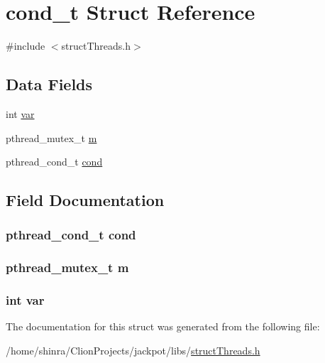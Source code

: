 \hypertarget{structcond__t}{\section{cond\+\_\+t Struct Reference}
\label{structcond__t}
}


{\ttfamily \#include $<$struct\+Threads.\+h$>$}

\subsection*{Data Fields}
\begin{DoxyCompactItemize}
\item 
int \hyperlink{structcond__t_a96c77f9f3a7baec84b9b8add26a31787}{var}
\item 
pthread\+\_\+mutex\+\_\+t \hyperlink{structcond__t_ae105583c374138efc8272abdbd6d2d25}{m}
\item 
pthread\+\_\+cond\+\_\+t \hyperlink{structcond__t_a0a1433271fddfed84bc959ae6c202e5a}{cond}
\end{DoxyCompactItemize}


\subsection{Field Documentation}
\hypertarget{structcond__t_a0a1433271fddfed84bc959ae6c202e5a}{
\subsubsection[{cond}]{\setlength{\rightskip}{0pt plus 5cm}pthread\+\_\+cond\+\_\+t {\bf cond}}}\label{structcond__t_a0a1433271fddfed84bc959ae6c202e5a}
\hypertarget{structcond__t_ae105583c374138efc8272abdbd6d2d25}{
\subsubsection[{m}]{\setlength{\rightskip}{0pt plus 5cm}pthread\+\_\+mutex\+\_\+t m}}\label{structcond__t_ae105583c374138efc8272abdbd6d2d25}
\hypertarget{structcond__t_a96c77f9f3a7baec84b9b8add26a31787}{
\subsubsection[{var}]{\setlength{\rightskip}{0pt plus 5cm}int var}}\label{structcond__t_a96c77f9f3a7baec84b9b8add26a31787}


The documentation for this struct was generated from the following file\+:\begin{DoxyCompactItemize}
\item 
/home/shinra/\+Clion\+Projects/jackpot/libs/\hyperlink{struct_threads_8h}{struct\+Threads.\+h}\end{DoxyCompactItemize}

